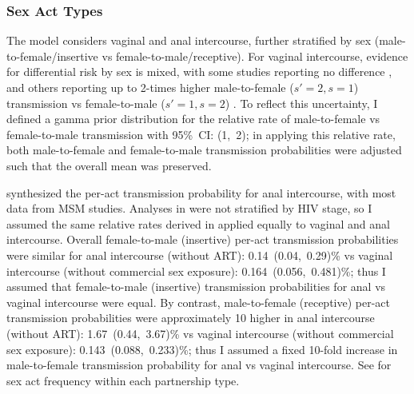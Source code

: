 \subsubsection{Sex Act Types}\label{model.par.beta.sex}
The model considers vaginal and anal intercourse,
further stratified by sex (male-to-female/insertive vs female-to-male/receptive).
For vaginal intercourse, evidence for differential risk by sex is mixed,
with some studies reporting no difference \cite{Wawer2005,Hughes2012},
and others reporting up to 2-times higher male-to-female ($s'=2,s=1$) transmission
vs female-to-male ($s'=1,s=2$) \cite{Boily2009}.
To reflect this uncertainty, I defined a gamma prior distribution for
the relative rate of male-to-female vs female-to-male transmission with 95\%~CI: (1,~2);
in applying this relative rate, both male-to-female and female-to-male transmission probabilities
were adjusted such that the overall mean was preserved.
\par
\citet{Baggaley2018} synthesized the per-act transmission probability for anal intercourse,
with most data from MSM studies.
Analyses in \cite{Baggaley2018} were not stratified by HIV stage,
so I assumed the same relative rates derived in 
applied equally to vaginal and anal intercourse.
Overall female-to-male (insertive) per-act transmission probabilities were similar for
anal intercourse \cite{Baggaley2013} (without ART): 0.14~(0.04,~0.29)\% vs
vaginal intercourse \cite{Boily2009} (without commercial sex exposure): 0.164~(0.056,~0.481)\%;
thus I assumed that female-to-male (insertive) transmission probabilities
for anal vs vaginal intercourse were equal.
By contrast, male-to-female (receptive) per-act transmission probabilities were approximately 10 higher
in anal intercourse \cite{Baggaley2018} (without ART): 1.67~(0.44,~3.67)\% vs
vaginal intercourse \cite{Boily2009} (without commercial sex exposure): 0.143~(0.088,~0.233)\%;
thus I assumed a fixed 10-fold increase in male-to-female transmission probability
for anal vs vaginal intercourse.
See  for sex act frequency within each partnership type.
